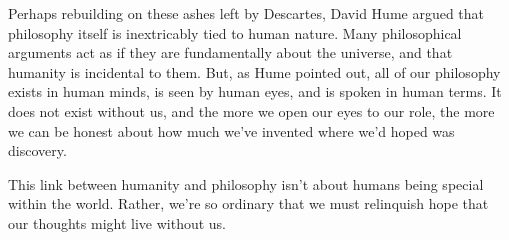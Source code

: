 \documentclass[20pt,]{extarticle}
\begin{document}
Perhaps rebuilding on these ashes left by Descartes, David Hume argued
that philosophy itself is inextricably tied to human nature. Many
philosophical arguments act as if they are fundamentally about the
universe, and that humanity is incidental to them. But, as Hume pointed
out, all of our philosophy exists in human minds, is seen by human eyes,
and is spoken in human terms. It does not exist without us, and the more
we open our eyes to our role, the more we can be honest about how much
we've invented where we'd hoped was discovery.

This link between humanity and philosophy isn't about humans being
special within the world. Rather, we're so ordinary that we must
relinquish hope that our thoughts might live without us.
\end{document}
